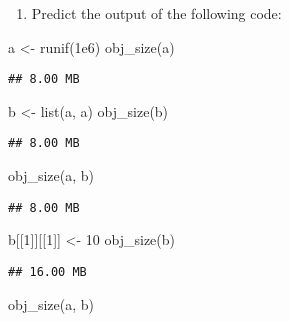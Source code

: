\documentclass[
]{article}
\newenvironment{Shaded}{\begin{snugshade}}{\end{snugshade}}
\newcommand{\DecValTok}[1]{\textcolor[rgb]{0.00,0.00,0.81}{#1}}
\newcommand{\FloatTok}[1]{\textcolor[rgb]{0.00,0.00,0.81}{#1}}
\newcommand{\FunctionTok}[1]{\textcolor[rgb]{0.00,0.00,0.00}{#1}}
\newcommand{\NormalTok}[1]{#1}
\newcommand{\OtherTok}[1]{\textcolor[rgb]{0.56,0.35,0.01}{#1}}
\providecommand{\tightlist}{%
  \setlength{\itemsep}{0pt}\setlength{\parskip}{0pt}}
\begin{document}
\begin{enumerate}
\def\labelenumi{\arabic{enumi}.}
\setcounter{enumi}{2}
\tightlist
\item
  Predict the output of the following code:
\end{enumerate}

\begin{Shaded}
\begin{Highlighting}[]
\NormalTok{a }\OtherTok{\textless{}{-}} \FunctionTok{runif}\NormalTok{(}\FloatTok{1e6}\NormalTok{)}
\FunctionTok{obj\_size}\NormalTok{(a)}
\end{Highlighting}
\end{Shaded}

\begin{verbatim}
## 8.00 MB
\end{verbatim}

\begin{Shaded}
\begin{Highlighting}[]
\NormalTok{b }\OtherTok{\textless{}{-}} \FunctionTok{list}\NormalTok{(a, a)}
\FunctionTok{obj\_size}\NormalTok{(b)}
\end{Highlighting}
\end{Shaded}

\begin{verbatim}
## 8.00 MB
\end{verbatim}

\begin{Shaded}
\begin{Highlighting}[]
\FunctionTok{obj\_size}\NormalTok{(a, b)}
\end{Highlighting}
\end{Shaded}

\begin{verbatim}
## 8.00 MB
\end{verbatim}

\begin{Shaded}
\begin{Highlighting}[]
\NormalTok{b[[}\DecValTok{1}\NormalTok{]][[}\DecValTok{1}\NormalTok{]] }\OtherTok{\textless{}{-}} \DecValTok{10}
\FunctionTok{obj\_size}\NormalTok{(b)}
\end{Highlighting}
\end{Shaded}

\begin{verbatim}
## 16.00 MB
\end{verbatim}

\begin{Shaded}
\begin{Highlighting}[]
\FunctionTok{obj\_size}\NormalTok{(a, b)}
\end{Highlighting}
\end{Shaded}
\end{document}

